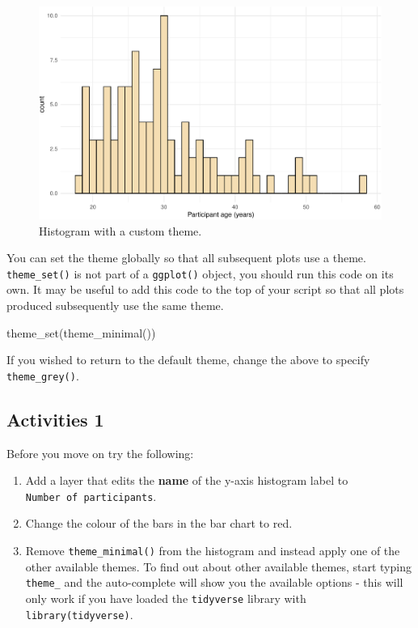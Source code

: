 \documentclass[
  english,
  doc,floatsintext]{apa6}
\newenvironment{Shaded}{\begin{snugshade}}{\end{snugshade}}
\newcommand{\FunctionTok}[1]{\textcolor[rgb]{0.00,0.00,0.00}{#1}}
\newcommand{\NormalTok}[1]{#1}
\begin{document}
\begin{figure}

{\centering \includegraphics[width=1\linewidth]{images/histogram-theme-1} 

}

\caption{Histogram with a custom theme.}\label{fig:histogram-theme}
\end{figure}

You can set the theme globally so that all subsequent plots use a theme. \texttt{theme\_set()} is not part of a \texttt{ggplot()} object, you should run this code on its own. It may be useful to add this code to the top of your script so that all plots produced subsequently use the same theme.

\begin{Shaded}
\begin{Highlighting}[]
\FunctionTok{theme\_set}\NormalTok{(}\FunctionTok{theme\_minimal}\NormalTok{())}
\end{Highlighting}
\end{Shaded}

If you wished to return to the default theme, change the above to specify \texttt{theme\_grey()}.

\hypertarget{activities-1}{%
\subsection{Activities 1}\label{activities-1}}

Before you move on try the following:

\begin{enumerate}
\def\labelenumi{\arabic{enumi}.}
\item
  Add a layer that edits the \textbf{name} of the y-axis histogram label to \texttt{Number\ of\ participants}.
\item
  Change the colour of the bars in the bar chart to red.
\item
  Remove \texttt{theme\_minimal()} from the histogram and instead apply one of the other available themes. To find out about other available themes, start typing \texttt{theme\_} and the auto-complete will show you the available options - this will only work if you have loaded the \texttt{tidyverse} library with \texttt{library(tidyverse)}.
\end{enumerate}
\end{document}
